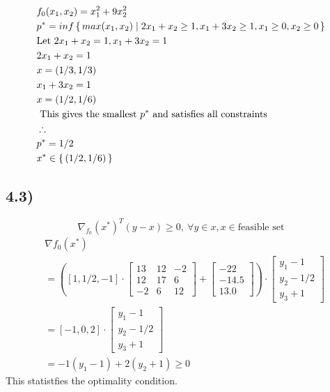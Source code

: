 \documentclass[12pt]{article}
\begin{document}
\begin{equation*}
\begin{aligned}
& f_0(x_1, x_2)= x_1^2 + 9x_2^2\\
& p^* = inf\set{max(x_1, x_2) | 2x_1 + x_2 \ge 1, x_1 + 3x_2 \ge 1, x_1 \ge 0, x_2 \ge 0}\\
& \text{Let } 2x_1 + x_2 = 1, x_1 + 3x_2 = 1\\
& 2x_1 + x_2 = 1\\
& x = (1/3, 1/3)\\
& x_1 + 3x_2 = 1\\
& x = (1/2, 1/6) \\
& \text{ This gives the smallest $p^*$ and satisfies all constraints} \\
& \therefore\\
& p^* = 1/2\\
& x^* \in \set{(1/2, 1/6)}
\end{aligned}
\end{equation*}

\subsection*{4.3)}

$$\nabla_{f_0}(x^*)^T(y-x) \ge 0,\ \forall y \in x, x \in \text{feasible set}$$
\begin{equation*}
\begin{aligned}
& \nabla{f_0}(x^*)\\
& = ([1, 1/2, -1]\cdot \begin{bmatrix}
    13 & 12 & -2 \\
    12 & 17 & 6 \\
    -2 & 6 & 12 
    \end{bmatrix} + \begin{bmatrix}
    -22\\
    -14.5\\
    13.0 
    \end{bmatrix})\cdot \begin{bmatrix}
    y_1 - 1\\
    y_2 - 1/2\\
    y_3 + 1 
    \end{bmatrix}\\
& = [-1, 0, 2]\cdot \begin{bmatrix}
    y_1 - 1\\
    y_2 - 1/2\\
    y_3 + 1 
    \end{bmatrix}\\
& = -1(y_1 - 1)+ 2(y_2 + 1) \ge 0
\end{aligned}
\end{equation*}
This statistfies the optimality condition.
\end{document}
